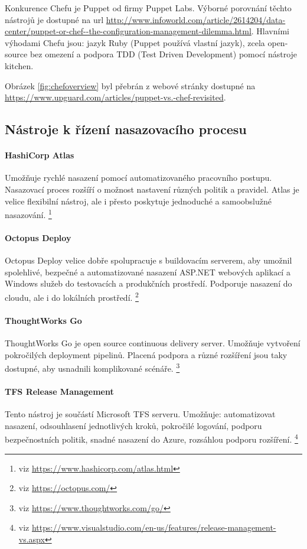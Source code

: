 Konkurence Chefu je Puppet od firmy Puppet Labs. Výborné porovnání těchto nástrojů je dostupné na url \url{http://www.infoworld.com/article/2614204/data-center/puppet-or-chef--the-configuration-management-dilemma.html}. Hlavními výhodami Chefu jsou: jazyk Ruby (Puppet používá vlastní jazyk), zcela open-source bez omezení a podpora TDD (Test Driven Development) pomocí nástroje kitchen.

Obrázek \ref{fig:chefoverview} byl přebrán z webové stránky dostupné na \url{https://www.upguard.com/articles/puppet-vs.-chef-revisited}.

\subsection{Nástroje k řízení nasazovacího procesu}
\paragraph{HashiCorp Atlas}
Umožňuje rychlé nasazení pomocí automatizovaného pracovního postupu. Nasazovací proces rozšíří o možnost nastavení různých politik a pravidel. Atlas je velice flexibilní nástroj, ale i přesto poskytuje jednoduché a samoobslužné nasazování. \footnote{viz \url{https://www.hashicorp.com/atlas.html}}

\paragraph{Octopus Deploy}
Octopus Deploy velice dobře spolupracuje s buildovacím serverem, aby umožnil spolehlivé, bezpečné a automatizované nasazení ASP.NET webových aplikací a Windows služeb do testovacích a produkčních prostředí. Podporuje nasazení do cloudu, ale i do lokálních prostředí. \footnote{viz \url{https://octopus.com/}}

\paragraph{ThoughtWorks Go}
ThoughtWorks Go je open source continuous delivery server. Umožňuje vytvoření pokročilých deployment pipelinů. Placená podpora a různé rozšíření jsou taky dostupné, aby usnadnili komplikované scénáře. \footnote{viz \url{https://www.thoughtworks.com/go/}}

\paragraph{TFS Release Management}
Tento nástroj je součástí Microsoft TFS serveru. Umožňuje: automatizovat nasazení, odsouhlasení jednotlivých kroků, pokročilé logování, podporu bezpečnostních politik, snadné nasazení do Azure, rozsáhlou podporu rozšíření. \footnote{viz \url{https://www.visualstudio.com/en-us/features/release-management-vs.aspx}}

